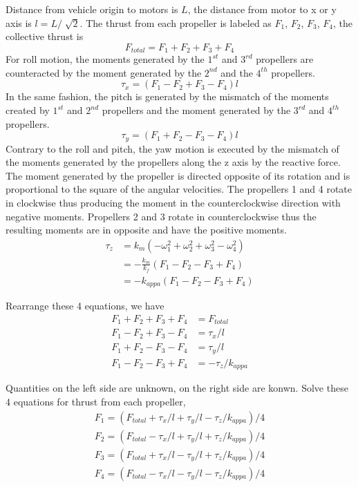 \documentclass[a4paper]{article}
\begin{document}
Distance from vehicle origin to motors is $L$, the distance from motor to x or y axis is $ l = L/\sqrt[]{2}$. The thrust from each propeller is labeled as $F_1$, $F_2$, $F_3$, $F_4$, the collective thrust is
$$ F_{total} = F_1 + F_2 + F_3 + F_4 $$
For roll motion, the moments generated by the $1^{st}$ and $3^{rd}$ propellers are counteracted by the moment generated by the $2^{nd}$ and the $4^{th}$ propellers. 
$$ \tau_x = (F_1 - F_2 + F_3 - F_4)l $$
In the same fashion, the pitch is generated by the mismatch of the moments created by $1^{st}$ and $2^{nd}$ propellers and the moment generated by the $3^{rd}$ and $4^{th}$ propellers.
$$ \tau_y = (F_1 + F_2 - F_3 - F_4)l $$
Contrary to the roll and pitch, the yaw motion is executed by the mismatch of the moments generated by the propellers along the z axis by the reactive force. The moment generated by the propeller is directed opposite of its rotation and is proportional to the square of the angular velocities. The propellers 1 and 4 rotate in clockwise thus producing the moment in the counterclockwise direction with negative moments. Propellers 2 and 3 rotate in counterclockwise thus the resulting moments are in opposite and have the positive moments.
\begin{align*}
\tau_z &= k_m (-\omega^2_1 + \omega^2_2 + \omega^2_3 - \omega^2_4) \\
       &= -\frac{k_m}{k_f} (F_1 - F_2 - F_3 + F_4) \\
       &= -k_{appa}  (F_1 - F_2 - F_3 + F_4)
\end{align*}

Rearrange these 4 equations, we have
\begin{align*}
F_1 + F_2 + F_3 + F_4 &= F_{total}  \\
F_1 - F_2 + F_3 - F_4 &= \tau_x / l \\
F_1 + F_2 - F_3 - F_4 &= \tau_y / l \\
F_1 - F_2 - F_3 + F_4 &= -\tau_z / k_{appa}
\end{align*}

Quantities on the left side are unknown, on the right side are konwn. Solve these 4 equations for thrust from each propeller,
\begin{align*}
F_1 = (F_{total} + \tau_x / l + \tau_y / l  -\tau_z / k_{appa})/4  \\
F_2 = (F_{total} - \tau_x / l + \tau_y / l  +\tau_z / k_{appa})/4 \\
F_3 = (F_{total} + \tau_x / l - \tau_y / l  +\tau_z / k_{appa})/4 \\
F_4 = (F_{total} - \tau_x / l - \tau_y / l  -\tau_z / k_{appa})/4
\end{align*}
\end{document}
